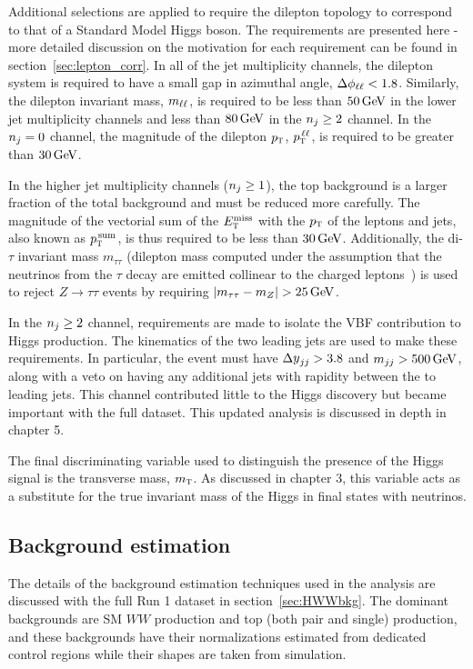 Additional selections are applied to require the dilepton topology to correspond to that of a Standard Model Higgs boson. The requirements are presented here - more detailed discussion on the motivation for each requirement can be found in section~\ref{sec:lepton_corr}. In all of the jet multiplicity channels, the dilepton system is required to have a small gap in azimuthal angle, $\Delta\phi_{\ell\ell} < 1.8$. Similarly, the dilepton invariant mass, $m_{\ell\ell}$, is required to be less than $50 \GeV$ in the lower jet multiplicity channels and less than $80 \GeV$ in the $n_j \geq 2$ channel.  In the $n_j = 0$ channel, the magnitude of the dilepton $p_{\textrm{\footnotesize\sc t}}$, $p_{\textrm{\footnotesize\sc t}}^{\,\ell\ell}$, is required to be greater than $30 \GeV$. 

In the higher jet multiplicity channels ($n_j \geq 1$), the top background is a larger fraction of the total background and must be reduced more carefully. The magnitude of the vectorial sum of the $E_{\textrm{\footnotesize\sc t}}^{\rm miss}$ with the $p_{\textrm{\footnotesize\sc t}}$ of the leptons and jets, also known as $p_{\textrm{\footnotesize\sc t}}^{\,\rm sum}$, is thus required to be less than $30 \GeV$. Additionally, the di-$\tau$ invariant mass $m_{\tau\tau}$ (dilepton mass computed under the assumption that the neutrinos from the $\tau$ decay are emitted collinear to the charged leptons~\cite{collinear}) is used to reject $Z\to\tau\tau$ events by requiring $|m_{\tau\tau} - m_{Z}| > 25 \GeV$.  

In the $n_j \geq 2$ channel, requirements are made to isolate the VBF contribution to Higgs production. The kinematics of the two leading jets are used to make these requirements. In particular, the event must have $\dyjj > 3.8$ and $\mjj > 500 \GeV$, along with a veto on having any additional jets with rapidity between the to leading jets. This channel contributed little to the Higgs discovery but became important with the full dataset. This updated analysis is discussed in depth in chapter 5. 

The final discriminating variable used to distinguish the presence of the Higgs signal is the transverse mass, $m_{\textrm{\footnotesize\sc t}}$. As discussed in chapter 3, this variable acts as a substitute for the true invariant mass of the Higgs in final states with neutrinos. 

\subsection{Background estimation}

The details of the background estimation techniques used in the \HWWfull analysis are discussed with the full Run 1 dataset in section~\ref{sec:HWWbkg}. The dominant backgrounds are SM $WW$ production and top (both pair and single) production, and these backgrounds have their normalizations estimated from dedicated control regions while their shapes are taken from simulation. 

